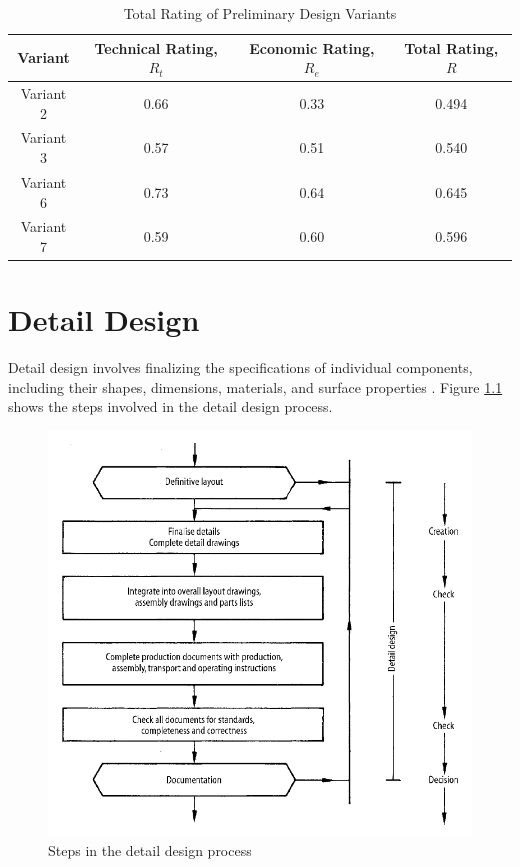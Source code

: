 \begin{table}[!ht]
    \centering
    \begin{tabular}{|c|c|c|c|}
        \hline
        \textbf{Variant} & \textbf{Technical Rating, $R_{t}$} & \textbf{Economic Rating, $R_{e}$} & \textbf{Total Rating, $R$} \\ \hline
        Variant 2        & 0.66                               & 0.33                              & 0.494                      \\ \hline
        Variant 3        & 0.57                               & 0.51                              & 0.540                      \\ \hline
        Variant 6        & 0.73                               & 0.64                              & 0.645                      \\ \hline
        Variant 7        & 0.59                               & 0.60                              & 0.596                      \\ \hline
    \end{tabular}
    \caption{Total Rating of Preliminary Design Variants}
    \label{tab:total_rating}
\end{table}


\chapter{Detail Design}
\label{ch:detail_design}
Detail design involves finalizing the specifications of individual components, including their shapes, dimensions, materials, and surface properties \cite[436]{Pahl2007}. Figure \ref{fig:detail_design_steps} shows the steps involved in the detail design process.

\begin{figure}[!ht]
    \centering
    \includegraphics[width=0.95\linewidth]{texs/Part1/chapter4/image/detaildesignstep.png}
    \caption{Steps in the detail design process}
    \label{fig:detail_design_steps}
\end{figure}

